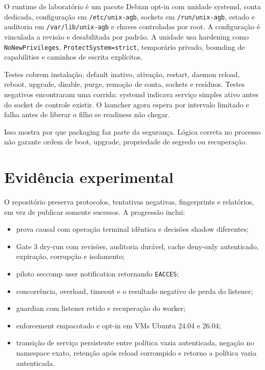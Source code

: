 \documentclass[11pt,a4paper]{article}
\begin{document}
O runtime de laboratório é um pacote Debian opt-in com unidade systemd, conta
dedicada, configuração em \texttt{/etc/unix-agb}, sockets em
\texttt{/run/unix-agb}, estado e auditoria em \texttt{/var/lib/unix-agb} e
chaves controladas por root. A configuração é vinculada a revisão e desabilitada
por padrão. A unidade usa hardening como \texttt{NoNewPrivileges},
\texttt{ProtectSystem=strict}, temporário privado, bounding de capabilities e
caminhos de escrita explícitos.

Testes cobrem instalação, default inativo, ativação, restart, daemon reload,
reboot, upgrade, disable, purge, remoção de conta, sockets e resíduos. Testes
negativos encontraram uma corrida: systemd indicava serviço simples ativo antes
do socket de controle existir. O launcher agora espera por intervalo limitado e
falha antes de liberar o filho se readiness não chegar.

Isso mostra por que packaging faz parte da segurança. Lógica correta no processo
não garante ordem de boot, upgrade, propriedade de segredo ou recuperação.

\section{Evidência experimental}

O repositório preserva protocolos, tentativas negativas, fingerprints e
relatórios, em vez de publicar somente sucessos. A progressão inclui:

\begin{itemize}[leftmargin=*]
  \item prova causal com operação terminal idêntica e decisões shadow diferentes;
  \item Gate 3 dry-run com revisões, auditoria durável, cache deny-only
        autenticado, expiração, corrupção e isolamento;
  \item piloto seccomp user notification retornando \texttt{EACCES};
  \item concorrência, overload, timeout e o resultado negativo de perda do
        listener;
  \item guardian com listener retido e recuperação do worker;
  \item enforcement empacotado e opt-in em VMs Ubuntu 24.04 e 26.04;
  \item transição de serviço persistente entre política vazia autenticada,
        negação no namespace exato, retenção após reload corrompido e retorno a
        política vazia autenticada.
\end{itemize}
\end{document}
